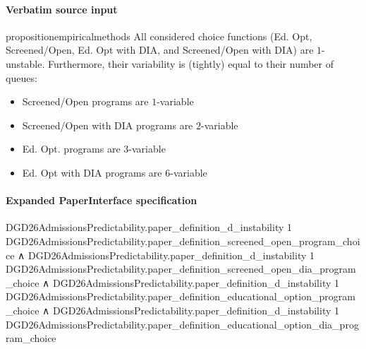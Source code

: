 \documentclass[10pt]{article}
\begin{document}
\paragraph{Verbatim source input}
\begin{ReviewVerbatim}
\begin{restatable}[]{proposition}{empiricalmethods}
\label{prop:program-variability}
All considered choice functions ({Ed. Opt}, {Screened/Open}, {Ed. Opt with DIA}, and {Screened/Open with DIA}) are $1$-unstable. Furthermore, their variability is (tightly) equal to their number of queues:

\begin{itemize}[noitemsep,topsep=0pt,parsep=0pt,partopsep=0pt]
    \item Screened/Open programs are $1$-variable
    \item Screened/Open with DIA programs are $2$-variable
    \item Ed. Opt. programs are $3$-variable
    \item Ed. Opt with DIA programs are $6$-variable
\end{itemize}

\end{restatable}
\end{ReviewVerbatim}



\paragraph{Expanded PaperInterface specification}
\begin{ReviewVerbatim}
DGD26AdmissionsPredictability.paper_definition_d_instability 1
    DGD26AdmissionsPredictability.paper_definition_screened_open_program_choice ∧
  DGD26AdmissionsPredictability.paper_definition_d_instability 1
      DGD26AdmissionsPredictability.paper_definition_screened_open_dia_program_choice ∧
    DGD26AdmissionsPredictability.paper_definition_d_instability 1
        DGD26AdmissionsPredictability.paper_definition_educational_option_program_choice ∧
      DGD26AdmissionsPredictability.paper_definition_d_instability 1
        DGD26AdmissionsPredictability.paper_definition_educational_option_dia_program_choice
\end{ReviewVerbatim}
\end{document}

